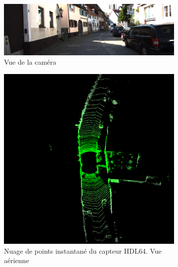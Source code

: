\begin{figure}[h]
	\begin{center}
		\begin{subfigure}{1.0\textwidth}
			\includegraphics[width=\textwidth]{Chapter4/graphics/KITTI_pict.png} 
			\caption{Vue de la caméra}
		\end{subfigure}	
		\newline
		\begin{subfigure}[t]{0.48\textwidth}
			\includegraphics[width=\textwidth]{Chapter4/graphics/KITTI_Velodyne.png} 
			\caption{Nuage de points instantané du capteur HDL64. Vue aérienne}
		\end{subfigure}	
		~
		\begin{subfigure}[t]{0.48\textwidth}

\end{subfigure}
\end{center}
\end{figure}
